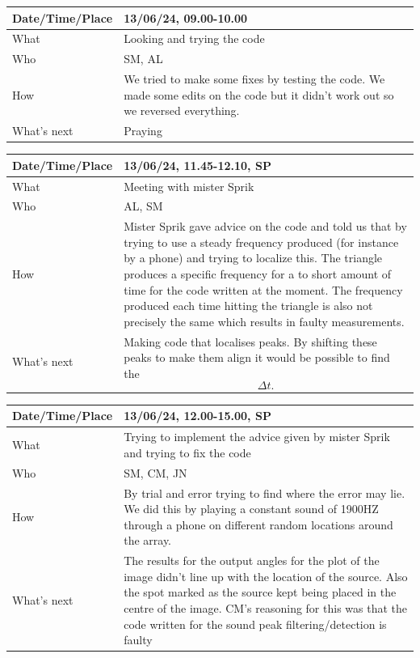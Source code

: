 \documentclass{article}
\begin{document}
\begin{table}[H]
\begin{tabular}{|p{1.5in}|p{4in}|}
\hline
Date/Time/Place &  13/06/24, 09.00-10.00\\ \hline
What            &  Looking and trying the code\\ \hline
Who             &  SM, AL\\ \hline
How             &  We tried to make some fixes by testing the code. We made some edits on the code but it didn't work out so we reversed everything.\\ \hline
What's next     &  Praying\\ \hline
\end{tabular}
\end{table}

\begin{table}[H]
\begin{tabular}{|p{1.5in}|p{4in}|}
\hline
Date/Time/Place & 13/06/24, 11.45-12.10, SP \\ \hline
What            & Meeting with mister Sprik \\ \hline
Who             & AL, SM \\ \hline
How             & Mister Sprik gave advice on the code and told us that by trying to use a steady frequency produced (for instance by a phone) and trying to localize this. The triangle produces a specific frequency for a to short amount of time for the code written at the moment. The frequency produced each time hitting the triangle is also not precisely the same which results in faulty measurements.   \\ \hline
What's next     & Making code that localises peaks. By shifting these peaks to make them align it would be possible to find the $$\Delta t.$$ \\ \hline
\end{tabular}
\end{table}

\begin{table}[H]
\begin{tabular}{|p{1.5in}|p{4in}|}
\hline
Date/Time/Place & 13/06/24, 12.00-15.00, SP \\ \hline
What            & Trying to implement the advice given by mister Sprik and trying to fix the code \\ \hline
Who             & SM, CM, JN \\ \hline
How             & By trial and error trying to find where the error may lie. We did this by playing a constant sound of 1900HZ through a phone on different random locations around the array.\\ \hline
What's next     &  The results for the output angles for the plot of the image didn't line up with the location of the source. Also the spot marked as the source kept being placed in the centre of the image. CM's reasoning for this was that the code written for the sound peak filtering/detection is faulty  \\ \hline
\end{tabular}
\end{table}
\end{document}
